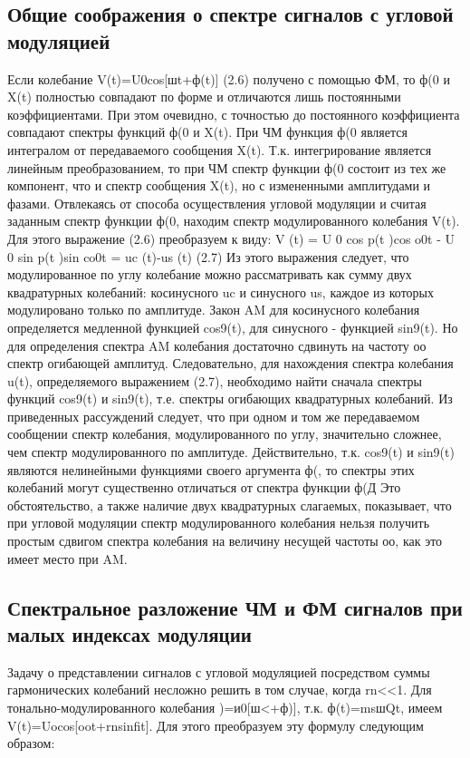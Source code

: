 ﻿\documentclass[a4paper,12pt]{article}
\begin{document}
\subsection{Общие соображения о спектре сигналов с угловой модуляцией}
Если колебание
V(t)=U0cos[шt+ф(t)]	(2.6)
получено с помощью ФМ, то ф(0 и X(t) полностью совпадают по форме и отличаются лишь постоянными коэффициентами. При этом очевидно, с точностью до постоянного коэффициента совпадают спектры функций ф(0 и X(t).
При ЧМ функция ф(0 является интегралом от передаваемого сообщения X(t). Т.к. интегрирование является линейным преобразованием, то при ЧМ спектр функции ф(0 состоит из тех же компонент, что и спектр сообщения X(t), но с измененными амплитудами и фазами.
Отвлекаясь от способа осуществления угловой модуляции и считая заданным спектр функции ф(0, находим спектр модулированного колебания V(t). Для этого выражение (2.6) преобразуем к виду:
V (t) = U 0 cos p(t )cos o0t - U 0 sin p(t )sin co0t = uc (t)-us (t)	(2.7)
Из этого выражения следует, что модулированное по углу колебание можно рассматривать как сумму двух квадратурных колебаний: косинусного uc и синусного us, каждое из которых модулировано только по амплитуде. Закон AM для косинусного колебания определяется медленной функцией cos9(t), для синусного - функцией sin9(t). Но для определения спектра AM колебания достаточно сдвинуть на частоту оо спектр огибающей амплитуд. Следовательно, для нахождения спектра колебания u(t), определяемого выражением (2.7), необходимо найти сначала спектры функций cos9(t) и sin9(t), т.е. спектры огибающих квадратурных колебаний.
Из приведенных рассуждений следует, что при одном и том же передаваемом сообщении спектр колебания, модулированного по углу, значительно сложнее, чем спектр модулированного по амплитуде. Действительно, т.к. cos9(t) и sin9(t) являются нелинейными функциями своего аргумента ф(, то спектры этих колебаний могут существенно отличаться от спектра функции ф(Д
Это обстоятельство, а также наличие двух квадратурных слагаемых, показывает, что при угловой модуляции спектр модулированного колебания нельзя получить простым сдвигом спектра колебания на величину несущей частоты оо, как это имеет место при AM.

\subsection{Спектральное разложение ЧМ и ФМ сигналов при малых индексах модуляции} %
	
Задачу о представлении сигналов с угловой модуляцией посредством суммы гармонических колебаний несложно решить в том случае, когда rn<<1. Для тонально-модулированного колебания	)=и0[ш<+ф)], т.к.	ф(t)=msшQt,	имеем
V(t)=Uocos[oot+rnsinfit].
Для этого преобразуем эту формулу следующим образом:
\end{document}
